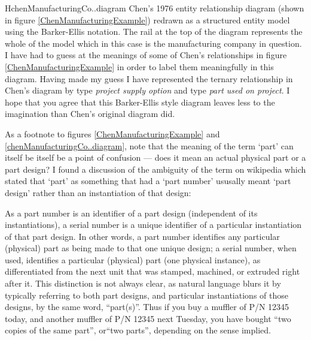 \begin{erboxedFigure} {H}{chenManufacturingCo..diagram}{
Chen's 1976 entity relationship diagram (shown in figure \ref{ChenManufacturingExample}) 
redrawn as a structured entity model using the Barker-Ellis notation. 
 The rail at the top of the diagram represents the whole of the model which in this case is the manufacturing company in question.
I have had to guess at the meanings of some of Chen's relationships in figure \ref{ChenManufacturingExample}
 in order to label them meaningfully in this diagram. 
Having made my guess I have represented  the ternary relationship in Chen's diagram by type \textit{project supply option} and type \textit{part used on project}. 
I hope that you agree that this Barker-Ellis style diagram leaves less to the imagination than Chen's original diagram did.
}
\scalebox{0.95}{}
\end{erboxedFigure}
As a footnote to figures \ref{ChenManufacturingExample} and \ref{chenManufacturingCo..diagram}, 
note that the  meaning of the term  `part' can itself be itself be a point of confusion ---
does it mean an actual physical part or  a part design?
I found a discussion of the ambiguity of the term  on wikipedia which stated that `part' as something that had a `part number' ususally meant `part design' rather than an instantiation of that design:
\begin{erquote}
As a part number is an identifier of a part design (independent of its instantiations), a serial number is a unique identifier of a particular instantiation of that part design. In other words, a part number identifies any particular (physical) part as being made to that one unique design; a serial number, when used, identifies a particular (physical) part (one physical instance), as differentiated from the next unit that was stamped, machined, or extruded right after it. This distinction is not always clear, as natural language blurs it by typically referring to both part designs, and particular instantiations of those designs, by the same word, ``part(s)''. Thus if you buy a muffler of P/N 12345 today, and another muffler of P/N 12345 next Tuesday, you have bought ``two copies of the same part'', or``two parts'', depending on the sense implied.
\end{erquote}

